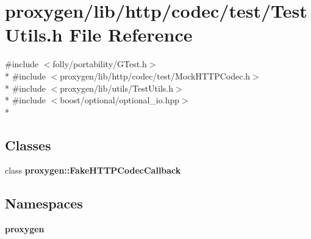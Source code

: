 \section{proxygen/lib/http/codec/test/\+Test\+Utils.h File Reference}
\label{http_2codec_2test_2TestUtils_8h}
{\ttfamily \#include $<$folly/portability/\+G\+Test.\+h$>$}\\*
{\ttfamily \#include $<$proxygen/lib/http/codec/test/\+Mock\+H\+T\+T\+P\+Codec.\+h$>$}\\*
{\ttfamily \#include $<$proxygen/lib/utils/\+Test\+Utils.\+h$>$}\\*
{\ttfamily \#include $<$boost/optional/optional\+\_\+io.\+hpp$>$}\\*
\subsection*{Classes}
\begin{DoxyCompactItemize}
\item 
class {\bf proxygen\+::\+Fake\+H\+T\+T\+P\+Codec\+Callback}
\end{DoxyCompactItemize}
\subsection*{Namespaces}
\begin{DoxyCompactItemize}
\item 
 {\bf proxygen}
\end{DoxyCompactItemize}
